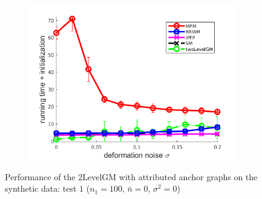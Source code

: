 \begin{figure}
\begin{subfigure}[b]{0.3\textwidth}
		\includegraphics[scale=0.25]{"chapter3/fig/SyntheticTest/descr/Results_v4.3.3/Test2/time_summary_avg10t"} 
	\end{subfigure} 
	\caption[Performance of the 2LevelGM with attributed anchor graphs on the synthetic data (test $1$)]{Performance of the 2LevelGM with attributed anchor graphs on the synthetic data: test $1$ ($n_1=100$, $\bar{n}=0$, $\sigma^2=0$)}
	\label{fig:synTest1_descr_ver433}
\end{figure}
